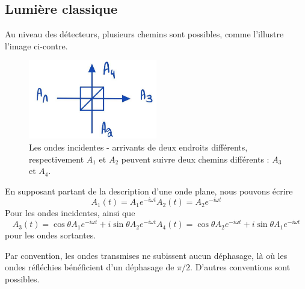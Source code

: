 \documentclass[../notesdecours.tex]{subfiles}
\begin{document}
\subsection{Lumière classique}
Au niveau des détecteurs, plusieurs chemins sont possibles, comme l'illustre l'image ci-contre.
\begin{center}
\begin{figure}[h]
\centering
\includegraphics[width=0.50\textwidth]{bean.png}
\caption{Les ondes incidentes - arrivants de deux endroits différents, respectivement $A_1$ et $A_2$ peuvent suivre deux chemins différents : $A_3$ et $A_4$.}
\label{Interferometre}
\end{figure}
\end{center}
En supposant partant de la description d'une onde plane, nous pouvons écrire
\begin{subequations}
\begin{equation}
A_1 (t) = A_1e^{-i\omega t}
\end{equation}
\begin{equation}
A_2 (t) = A_2e^{-i\omega t}
\end{equation}
\end{subequations}
Pour les ondes incidentes, ainsi que
\begin{subequations}
\begin{equation}
A_3 (t) = \cos\theta A_1e^{-i\omega t} + i \sin\theta A_2e^{-i\omega t}
\end{equation}
\begin{equation}
A_4 (t) = \cos\theta A_2e^{-i\omega t} + i\sin\theta  A_1e^{-i\omega t}
\end{equation}
\end{subequations}
pour les ondes sortantes.
\begin{remark} Par convention, les ondes transmises ne subissent aucun déphasage, là où les ondes réfléchies bénéficient d'un déphasage de $\pi / 2$. D'autres conventions sont possibles.\end{remark}
\end{document}
